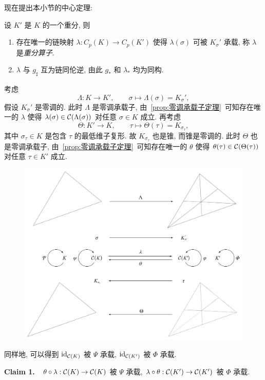 现在提出本小节的中心定理: 

\begin{Theorem}[代数重分定理]\label{thm:代数重分定理}
	设 $ K' $ 是 $ K $ 的一个重分, 则
	\begin{enumerate}[(1)]
		\item 存在唯一的链映射 $ \lambda : C_p(K)\to C_p(K') $ 使得 $ \lambda(\sigma) $ 可被 $ K_\sigma' $ 承载, 称 $ \lambda $ 是\emph{重分算子}.
		\item $ \lambda $ 与 $ g_\sharp $ 互为链同伦逆, 由此 $ g_* $ 和 $ \lambda_* $ 均为同构.
	\end{enumerate}
\end{Theorem}
\begin{Proof}
	考虑
	\[
		\Lambda : K\to K',\qquad\sigma\mapsto\Lambda(\sigma)=K_\sigma',
	\]
	假设 $ K_\sigma' $ 是零调的. 此时 $ \Lambda $ 是零调承载子, 由~\ref{prop:零调承载子定理}~可知存在唯一的 $ \lambda $ 使得 $ \lambda(\sigma)\in\mathcal{C}(\Lambda(\sigma)) $ 对任意 $ \sigma\in K $ 成立. 再考虑
	\[
		\Theta : K'\to K,\qquad \tau\mapsto\Theta(\tau)=K_{\sigma_\tau},
	\]
	其中 $ \sigma_\tau\in K $ 是包含 $ \tau $ 的最低维子复形. 故 $ K_{\sigma_\tau} $ 也是锥, 而锥是零调的. 此时 $ \Theta $ 也是零调承载子, 由~\ref{prop:零调承载子定理}~可知存在唯一的 $ \theta $ 使得 $ \theta(\tau)\in\mathcal{C}(\Theta(\tau)) $ 对任意 $ \tau\in K' $ 成立.

	\begin{figure}[htbp]
		\centering
		\includegraphics[width=0.85\linewidth]{figures/Sec5-5.png}
	\end{figure}
	
	同样地, 可以得到 $ \mathrm{id}_{\mathcal{C}(K)} $ 被 $ \Psi $ 承载, $ \mathrm{id}_{\mathcal{C}(K')} $ 被 $ \varPhi $ 承载.

	\textbf{Claim 1.}\ \ $ \theta\circ\lambda : \mathcal{C}(K)\to\mathcal{C}(K) $ 被 $ \Psi $ 承载, $ \lambda\circ\theta : \mathcal{C}(K')\to\mathcal{C}(K') $ 被 $ \varPhi $ 承载.


\end{Proof}

